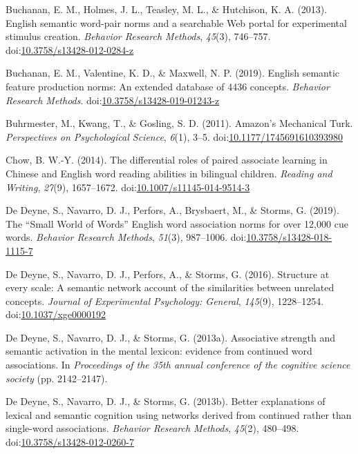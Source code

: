 \documentclass[english,,man]{apa6}
\begin{document}
\leavevmode\hypertarget{ref-Buchanan2013}{}%
Buchanan, E. M., Holmes, J. L., Teasley, M. L., \& Hutchison, K. A. (2013). English semantic word-pair norms and a searchable Web portal for experimental stimulus creation. \emph{Behavior Research Methods}, \emph{45}(3), 746--757. doi:\href{https://doi.org/10.3758/s13428-012-0284-z}{10.3758/s13428-012-0284-z}

\leavevmode\hypertarget{ref-Buchanan2019}{}%
Buchanan, E. M., Valentine, K. D., \& Maxwell, N. P. (2019). English semantic feature production norms: An extended database of 4436 concepts. \emph{Behavior Research Methods}. doi:\href{https://doi.org/10.3758/s13428-019-01243-z}{10.3758/s13428-019-01243-z}

\leavevmode\hypertarget{ref-Buhrmester2011}{}%
Buhrmester, M., Kwang, T., \& Gosling, S. D. (2011). Amazon's Mechanical Turk. \emph{Perspectives on Psychological Science}, \emph{6}(1), 3--5. doi:\href{https://doi.org/10.1177/1745691610393980}{10.1177/1745691610393980}

\leavevmode\hypertarget{ref-Chow2014}{}%
Chow, B. W.-Y. (2014). The differential roles of paired associate learning in Chinese and English word reading abilities in bilingual children. \emph{Reading and Writing}, \emph{27}(9), 1657--1672. doi:\href{https://doi.org/10.1007/s11145-014-9514-3}{10.1007/s11145-014-9514-3}

\leavevmode\hypertarget{ref-DeDeyne2018}{}%
De Deyne, S., Navarro, D. J., Perfors, A., Brysbaert, M., \& Storms, G. (2019). The ``Small World of Words'' English word association norms for over 12,000 cue words. \emph{Behavior Research Methods}, \emph{51}(3), 987--1006. doi:\href{https://doi.org/10.3758/s13428-018-1115-7}{10.3758/s13428-018-1115-7}

\leavevmode\hypertarget{ref-DeDeyne2016}{}%
De Deyne, S., Navarro, D. J., Perfors, A., \& Storms, G. (2016). Structure at every scale: A semantic network account of the similarities between unrelated concepts. \emph{Journal of Experimental Psychology: General}, \emph{145}(9), 1228--1254. doi:\href{https://doi.org/10.1037/xge0000192}{10.1037/xge0000192}

\leavevmode\hypertarget{ref-DeDeyne2013a}{}%
De Deyne, S., Navarro, D. J., \& Storms, G. (2013a). Associative strength and semantic activation in the mental lexicon: evidence from continued word associations. In \emph{Proceedings of the 35th annual conference of the cognitive science society} (pp. 2142--2147).

\leavevmode\hypertarget{ref-DeDeyne2013}{}%
De Deyne, S., Navarro, D. J., \& Storms, G. (2013b). Better explanations of lexical and semantic cognition using networks derived from continued rather than single-word associations. \emph{Behavior Research Methods}, \emph{45}(2), 480--498. doi:\href{https://doi.org/10.3758/s13428-012-0260-7}{10.3758/s13428-012-0260-7}
\end{document}
